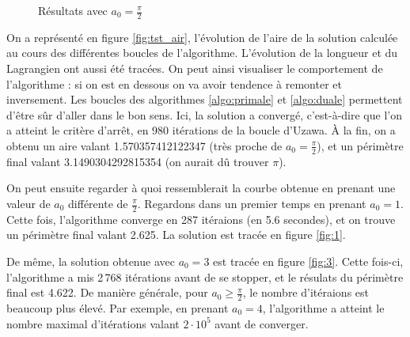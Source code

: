\documentclass[10pt,a4paper]{article}
\theoremstyle{plain}
\theoremstyle{definition}
\begin{document}
\begin{figure}
{	}
	\caption{Résultats avec $a_0=\frac{\pi}{2}$}
\end{figure}

On a représenté en figure \ref{fig:tst_air}, l'évolution de l'aire de la solution calculée au cours des différentes boucles de l'algorithme. L'évolution de la longueur et du Lagrangien ont aussi été tracées. On peut ainsi visualiser le comportement de l'algorithme : si on est en dessous on va avoir tendence à remonter et inversement. Les boucles des algorithmes \ref{algo:primale} et \ref{algo:duale} permettent d'être sûr d'aller dans le bon sens. Ici, la solution a convergé, c'est-à-dire que l'on a atteint le critère d'arrêt, en 980 itérations de la boucle d'Uzawa. À la fin, on a obtenu un aire valant 1.570357412122347 (très proche de $a_0=\frac{\pi}{2}$), et un périmètre final valant 3.1490304292815354 (on aurait dû trouver $\pi$).


On peut ensuite regarder à quoi ressemblerait la courbe obtenue en prenant une valeur de $a_0$ différente de $\frac{\pi}{2}$. Regardons dans un premier temps en prenant $a_0=1$. Cette fois, l'algorithme converge en 287 itéraions (en 5.6 secondes), et on trouve un périmètre final valant 2.625. La solution est tracée en figure \ref{fig:1}.

De même, la solution obtenue avec $a_0=3$ est tracée en figure \ref{fig:3}. Cette fois-ci, l'algorithme a mis 2\,768 itérations avant de se stopper, et le résulats du périmètre final est 4.622. De manière générale, pour $a_0\geqslant\frac{\pi}{2}$, le nombre d'itéraions est beaucoup plus élevé. Par exemple, en prenant $a_0=4$, l'algorithme a atteint le nombre maximal d'itérations valant $2\cdot10^{5}$ avant de converger.
\end{document}
